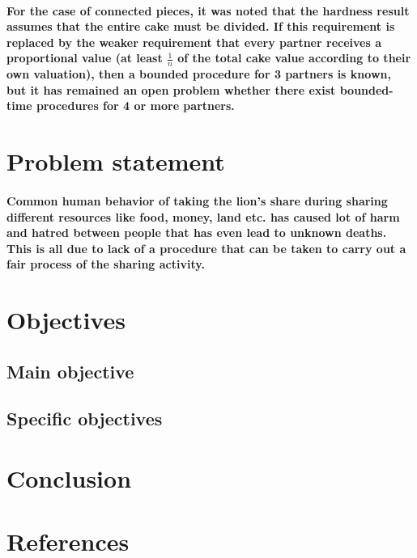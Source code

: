 \documentclass[12pt]{report}
\begin{document}
\paragraph{For the case of connected pieces, it was noted that the hardness result assumes that the entire cake must be divided. If this requirement is replaced by the weaker requirement that every partner receives a proportional value (at least $\frac{1}{n}$ of the total cake value according to their own valuation), then a bounded procedure for 3 partners is known, but it has remained an open problem whether there exist bounded-time procedures for 4 or more partners.
	}
\section{Problem statement}
\paragraph{Common human behavior of taking the lion's share during sharing different resources like food, money, land etc. has caused lot of harm and hatred between people that has even lead to unknown deaths. This is all due to lack of a procedure that can be taken to carry out a fair process of the sharing activity. }
\section{Objectives}
\subsection{Main objective}
\subsection{Specific objectives}
\section{Conclusion}
\section{References}
\end{document}
